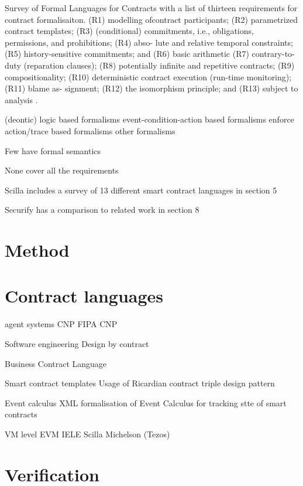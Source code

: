 \documentclass{article}
\begin{document}
Survey of Formal Languages for Contracts with a list of thirteen requirements for contract formalisaiton.
(R1) modelling ofcontract participants; (R2) parametrized contract templates; (R3) (conditional) commitments, i.e., obligations, permissions, and prohibitions; (R4) abso- lute and relative temporal constraints; (R5) history-sensitive commitments; and (R6) basic arithmetic
(R7) contrary-to-duty (reparation clauses); (R8) potentially infinite and repetitive contracts; (R9) compositionality; (R10) deterministic contract execution (run-time monitoring); (R11) blame as- signment; (R12) the isomorphism principle; and (R13) subject to analysis
 \cite{Hvitved2010}.
 
(deontic) logic based formalisms
event-condition-action based formalisms enforce
action/trace based formalisms
other formalisms

Few have formal semantics \cite{Andersen2006} \cite{Kyas2008} \cite{Xu2004}

None cover all the requirements


Scilla includes a survey of 13 different smart contract languages in section 5 \cite{Sergey2018}

Securify has a comparison to related work in section 8 \cite{Tsankov2017}



\section{Method}



\section{Contract languages}

agent systems
CNP \cite{Smith1980}
FIPA CNP \cite{FIPA2002}


Software engineering
Design by contract \cite{Meyer1992}

Business Contract Language \cite{Neal.2003}

Smart contract templates
Usage of Ricardian contract triple design pattern \cite{Clack2016}


Event calculus
XML formalisation of Event Calculus for tracking stte of smart contracts \cite{Farrell2004}


VM level
EVM \cite{Wood2014}
IELE \cite{Kasampalis2018}
Scilla \cite{Sergey2018}
Michelson (Tezos) \cite{DynamicLedgerSolutions2017}

\section{Verification}





\end{document}

